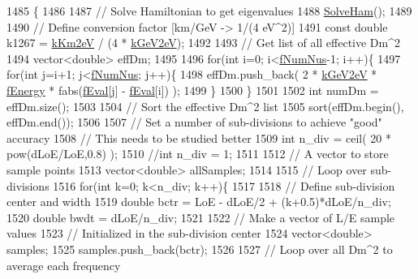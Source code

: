 \begin{DoxyCode}
1485 \{
1486 
1487   \textcolor{comment}{// Solve Hamiltonian to get eigenvalues}
1488   \hyperlink{classOscProb_1_1PMNS__Base_a91f065cb9e910e0095e41462b4420b01}{SolveHam}();
1489 
1490   \textcolor{comment}{// Define conversion factor [km/GeV -> 1/(4 eV^2)]}
1491   \textcolor{keyword}{const} \textcolor{keywordtype}{double} k1267 = \hyperlink{classOscProb_1_1PMNS__Base_a382ddd7b76ca89b43f22614a2ea7327b}{kKm2eV} / (4 * \hyperlink{classOscProb_1_1PMNS__Base_ad36a0a6bf58d6ec093d3947784bd89e9}{kGeV2eV});
1492 
1493   \textcolor{comment}{// Get list of all effective Dm^2}
1494   vector<double> effDm;
1495 
1496   \textcolor{keywordflow}{for}(\textcolor{keywordtype}{int} i=0; i<\hyperlink{classOscProb_1_1PMNS__Base_a24bb74bed63569dfe88b18fa6a08060e}{fNumNus}-1; i++)\{
1497     \textcolor{keywordflow}{for}(\textcolor{keywordtype}{int} j=i+1; j<\hyperlink{classOscProb_1_1PMNS__Base_a24bb74bed63569dfe88b18fa6a08060e}{fNumNus}; j++)\{
1498       effDm.push\_back( 2 * \hyperlink{classOscProb_1_1PMNS__Base_ad36a0a6bf58d6ec093d3947784bd89e9}{kGeV2eV} * \hyperlink{classOscProb_1_1PMNS__Base_a2800af6d436972f3e900867790c046b0}{fEnergy} * fabs(\hyperlink{classOscProb_1_1PMNS__Base_a6319c34d7decbb9d7d6da279c06e8c2d}{fEval}[j] - 
      \hyperlink{classOscProb_1_1PMNS__Base_a6319c34d7decbb9d7d6da279c06e8c2d}{fEval}[i]) );
1499     \}
1500   \}
1501 
1502   \textcolor{keywordtype}{int} numDm = effDm.size();
1503 
1504   \textcolor{comment}{// Sort the effective Dm^2 list}
1505   sort(effDm.begin(), effDm.end());
1506 
1507   \textcolor{comment}{// Set a number of sub-divisions to achieve "good" accuracy}
1508   \textcolor{comment}{// This needs to be studied better}
1509   \textcolor{keywordtype}{int} n\_div = ceil( 20 * pow(dLoE/LoE,0.8) );
1510   \textcolor{comment}{//int n\_div = 1;}
1511 
1512   \textcolor{comment}{// A vector to store sample points}
1513   vector<double> allSamples;
1514 
1515   \textcolor{comment}{// Loop over sub-divisions}
1516   \textcolor{keywordflow}{for}(\textcolor{keywordtype}{int} k=0; k<n\_div; k++)\{
1517 
1518     \textcolor{comment}{// Define sub-division center and width}
1519     \textcolor{keywordtype}{double} bctr = LoE - dLoE/2 + (k+0.5)*dLoE/n\_div;
1520     \textcolor{keywordtype}{double} bwdt = dLoE/n\_div;
1521 
1522     \textcolor{comment}{// Make a vector of L/E sample values}
1523     \textcolor{comment}{// Initialized in the sub-division center}
1524     vector<double> samples;
1525     samples.push\_back(bctr);
1526 
1527     \textcolor{comment}{// Loop over all Dm^2 to average each frequency}

\end{DoxyCode}
